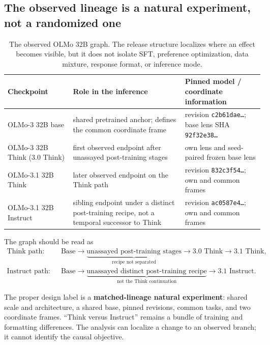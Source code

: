 \documentclass[11pt]{article}
\begin{document}
\subsection{The observed lineage is a natural experiment, not a randomized one}

\begin{table}[H]
\centering\small
\begin{tabularx}{\textwidth}{@{}p{}X p{}@{}}
\toprule
\textbf{Checkpoint} & \textbf{Role in the inference} & \textbf{Pinned model / coordinate information}\\
\midrule
OLMo-3 32B base & shared pretrained anchor; defines the common coordinate frame & revision \texttt{c2b61dae\ldots}; base lens SHA \texttt{92f32e38\ldots}\\
OLMo-3 32B Think (3.0 Think) & first observed endpoint after unassayed post-training stages & own lens and seed-paired frozen base lens\\
OLMo-3.1 32B Think & later observed endpoint on the Think path & revision \texttt{832c3f54\ldots}; own and common frames\\
OLMo-3.1 32B Instruct & sibling endpoint under a distinct post-training recipe, not a temporal successor to Think & revision \texttt{ac0587e4\ldots}; own and common frames\\
\bottomrule
\end{tabularx}
\caption{The observed OLMo 32B graph. The release structure localizes where an effect becomes visible, but it does not isolate SFT, preference optimization, data mixture, response format, or inference mode.}
\label{tab:lineage}
\end{table}

The graph should be read as
\[
\begin{aligned}
\text{Think path:}\quad
&\text{Base}\longrightarrow
\underbrace{\text{unassayed post-training stages}}_{\text{recipe not separated}}
\longrightarrow \text{3.0 Think}\longrightarrow \text{3.1 Think},\\
\text{Instruct path:}\quad
&\text{Base}\longrightarrow
\underbrace{\text{unassayed distinct post-training recipe}}_{\text{not the Think continuation}}
\longrightarrow \text{3.1 Instruct}.
\end{aligned}
\]

\begin{statusbox}
The proper design label is a \textbf{matched-lineage natural experiment}:
shared scale and architecture, a shared base, pinned revisions, common tasks,
and two coordinate frames. ``Think versus Instruct'' remains a bundle of
training and formatting differences. The analysis can localize a change to an
observed branch; it cannot identify the causal objective.
\end{statusbox}
\end{document}
